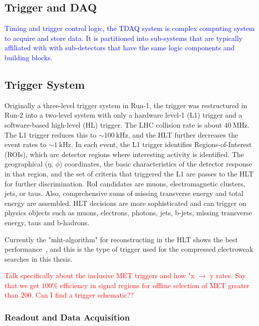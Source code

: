 \subsection{Trigger and DAQ}
\textcolor{blue}{Timing and  trigger control logic, the TDAQ system is complex computing system to acquire and store data.  It is partitioned into sub-systems that are typically affiliated with with sub-detectors that have the same logic components and building blocks.}  \fi
\subsection{Trigger System}
Originally a three-level trigger system in Run-1, the trigger was restructured in Run-2 into a two-level system with only a hardware level-1 (L1) trigger and a software-based high-level (HL) trigger.  The LHC collision rate is about $40~\mathrm{MHz}$.  The L1 trigger reduces this to $\sim100~\mathrm{kHz}$, and the HLT further decreases the event rates to $\sim1~\mathrm{kHz}$.  In each event, the L1 trigger identifies Regions-of-Interest (ROIs), which are detector regions where interesting activity is identified. The geographical ($\eta$, $\phi$) coordinates, the basic characteristics of the detector response in that region, and the set of criteria that triggered the L1 are passes to the HLT for further discrimination.  RoI candidates are muons, electromagnetic clusters, jets, or taus.  Also, comprehensive sums of missing transverse energy and total energy are assembled.  HLT decisions are more sophisticated and can trigger on physics objects such as muons, electrons, photons, jets, b-jets, missing transverse energy, taus and b-hadrons.  

Currently the "mht-algorithm" for reconstructing \met{} in the HLT shows the best performance~\cite{1748-0221-12-03-C03024}, and this is the type of \met trigger used for the compressed electroweak searches in this thesis.

\textcolor{red}{Talk specifically about the inclusive MET triggers and how "x $\rightarrow$ y rates.  Say that we get $100\%$ efficiency in signal regions for offline selection of MET greater than $200$.  Can I find a trigger schematic??}

\iffalse
\subsubsection{Readout and Data Acquisition}

